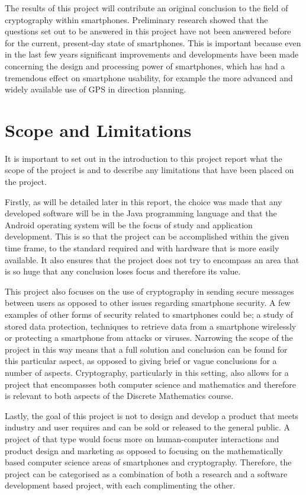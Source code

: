 \documentclass[a4paper,12pt]{report}
\begin{document}
The results of this project will contribute an original conclusion to the field of cryptography within smartphones. Preliminary research showed that the questions set out to be answered in this project have not been answered before for the current, present-day state of smartphones. This is important because even in the last few years significant improvements and developments have been made concerning the design and processing power of smartphones, which has had a tremendous effect on smartphone usability, for example the more advanced and widely available use of GPS in direction planning. 

\section{Scope and Limitations}

It is important to set out in the introduction to this project report what the scope of the project is and to describe any limitations that have been placed on the project.

Firstly, as will be detailed later in this report, the choice was made that any developed software will be in the Java programming language and that the Android operating system will be the focus of study and application development. This is so that the project can be accomplished within the given time frame, to the standard required and with hardware that is more easily available. It also ensures that the project does not try to encompass an area that is so huge that any conclusion loses focus and therefore its value.

This project also focuses on the use of cryptography in sending secure messages between users as opposed to other issues regarding smartphone security. A few examples of other forms of security related to smartphones could be; a study of stored data protection, techniques to retrieve data from a smartphone wirelessly or protecting a smartphone from attacks or viruses. Narrowing the scope of the project in this way means that a full solution and conclusion can be found for this particular aspect, as opposed to giving brief or vague conclusions for a number of aspects. Cryptography, particularly in this setting, also allows for a project that encompasses both computer science and mathematics and therefore is relevant to both aspects of the Discrete Mathematics course. 

Lastly, the goal of this project is not to design and develop a product that meets industry and user requires and can be sold or released to the general public. A project of that type would focus more on human-computer interactions and product design and marketing as opposed to focusing on the mathematically based computer science areas of smartphones and cryptography. Therefore, the project can be categorised as a combination of both a research and a software development based project, with each complimenting the other.
\end{document}
